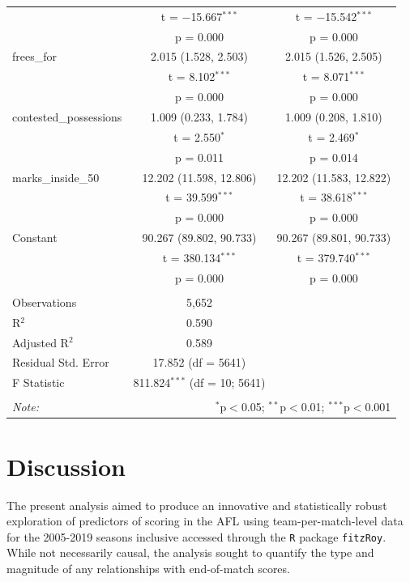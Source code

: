 \documentclass{article}
\begin{document}
\begin{table}[!htbp]
\begin{tabular}{@{\extracolsep{5pt}}lcc}
  & t = $-$15.667$^{***}$ & t = $-$15.542$^{***}$ \\ 
  & p = 0.000 & p = 0.000 \\ 
  frees\_for & 2.015 (1.528, 2.503) & 2.015 (1.526, 2.505) \\ 
  & t = 8.102$^{***}$ & t = 8.071$^{***}$ \\ 
  & p = 0.000 & p = 0.000 \\ 
  contested\_possessions & 1.009 (0.233, 1.784) & 1.009 (0.208, 1.810) \\ 
  & t = 2.550$^{*}$ & t = 2.469$^{*}$ \\ 
  & p = 0.011 & p = 0.014 \\ 
  marks\_inside\_50 & 12.202 (11.598, 12.806) & 12.202 (11.583, 12.822) \\ 
  & t = 39.599$^{***}$ & t = 38.618$^{***}$ \\ 
  & p = 0.000 & p = 0.000 \\ 
  Constant & 90.267 (89.802, 90.733) & 90.267 (89.801, 90.733) \\ 
  & t = 380.134$^{***}$ & t = 379.740$^{***}$ \\ 
  & p = 0.000 & p = 0.000 \\ 
 \hline \\[-1.8ex] 
Observations & 5,652 &  \\ 
R$^{2}$ & 0.590 &  \\ 
Adjusted R$^{2}$ & 0.589 &  \\ 
Residual Std. Error & 17.852 (df = 5641) &  \\ 
F Statistic & 811.824$^{***}$ (df = 10; 5641) &  \\ 
\hline 
\hline \\[-1.8ex] 
\textit{Note:}  & \multicolumn{2}{r}{$^{*}$p$<$0.05; $^{**}$p$<$0.01; $^{***}$p$<$0.001} \\ 
\end{tabular} 
\end{table}

\hypertarget{discussion}{%
\section{Discussion}\label{discussion}}

The present analysis aimed to produce an innovative and statistically robust exploration of predictors of scoring in the AFL using team-per-match-level data for the 2005-2019 seasons inclusive accessed through the \texttt{R} package \texttt{fitzRoy}. While not necessarily causal, the analysis sought to quantify the type and magnitude of any relationships with end-of-match scores.
\end{document}
